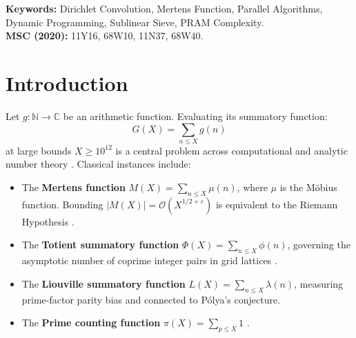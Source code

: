 \documentclass[11pt,a4paper]{article}
\theoremstyle{plain}
\theoremstyle{definition}
\newcommand{\N}{\mathbb{N}}
\newcommand{\C}{\mathbb{C}}
\newcommand{\Oh}{\mathcal{O}}
\newcommand{\abs}[1]{\left| #1 \right|}
\begin{document}
\noindent\textbf{Keywords:} Dirichlet Convolution, Mertens Function, Parallel Algorithms, Dynamic Programming, Sublinear Sieve, PRAM Complexity. \\
\noindent\textbf{MSC (2020):} 11Y16, 68W10, 11N37, 68W40.

\newpage

\section{Introduction}

Let $g: \N \to \C$ be an arithmetic function. Evaluating its summatory function:
\begin{equation}
    G(X) = \sum_{n \le X} g(n)
\end{equation}
at large bounds $X \ge 10^{12}$ is a central problem across computational and analytic number theory \cite{crandall2005prime}. Classical instances include:
\begin{itemize}
    \item The \textbf{Mertens function} $M(X) = \sum_{n \le X} \mu(n)$, where $\mu$ is the M{\"o}bius function. Bounding $\abs{M(X)} = \Oh(X^{1/2+\varepsilon})$ is equivalent to the Riemann Hypothesis \cite{mertens1897uber, deleglise1996computing}.
    \item The \textbf{Totient summatory function} $\Phi(X) = \sum_{n \le X} \phi(n)$, governing the asymptotic number of coprime integer pairs in grid lattices \cite{pritchard1987linear}.
    \item The \textbf{Liouville summatory function} $L(X) = \sum_{n \le X} \lambda(n)$, measuring prime-factor parity bias and connected to P{\'o}lya's conjecture.
    \item The \textbf{Prime counting function} $\pi(X) = \sum_{p \le X} 1$ \cite{lucy2011algorithm, lagarias1985computing}.
\end{itemize}
\end{document}
